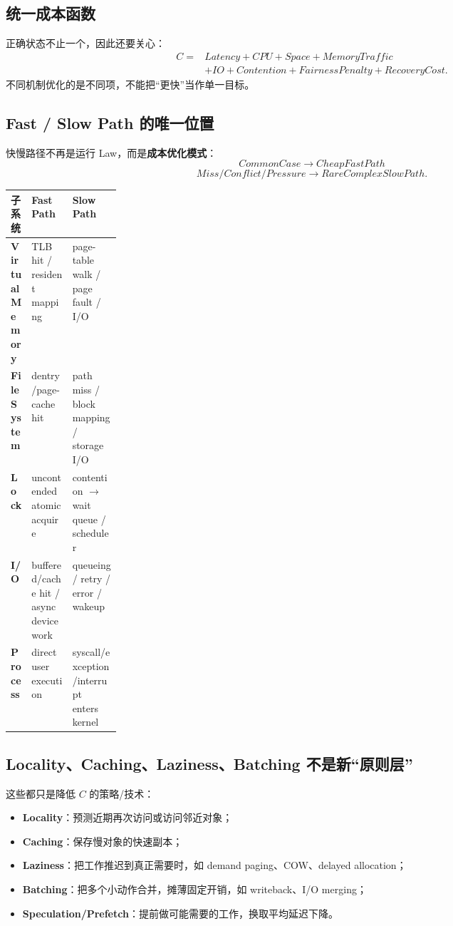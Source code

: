\documentclass[11pt,a4paper]{ctexart}
\newcommand{\kw}[1]{\textbf{#1}}
\begin{document}
\subsection{统一成本函数}
正确状态不止一个，因此还要关心：
\[
\boxed{\begin{aligned}
C={}&Latency+CPU+Space+MemoryTraffic\\
   &+IO+Contention+FairnessPenalty+RecoveryCost.
\end{aligned}}
\]
不同机制优化的是不同项，不能把“更快”当作单一目标。

\subsection{Fast / Slow Path 的唯一位置}
快慢路径不再是运行 Law，而是\kw{成本优化模式}：
\[
\boxed{CommonCase\rightarrow CheapFastPath}
\]
\[
\boxed{Miss/Conflict/Pressure\rightarrow RareComplexSlowPath}.
\]

\begin{center}
\small
\begin{tabularx}{\linewidth}{>{\bfseries}p{0.18\linewidth} X X}
\toprule
子系统 & Fast Path & Slow Path \\
\midrule
Virtual Memory & TLB hit / resident mapping & page-table walk / page fault / I/O \\
File System & dentry/page-cache hit & path miss / block mapping / storage I/O \\
Lock & uncontended atomic acquire & contention $\to$ wait queue / scheduler \\
I/O & buffered/cache hit / async device work & queueing / retry / error / wakeup \\
Process & direct user execution & syscall/exception/interrupt enters kernel \\
\bottomrule
\end{tabularx}
\end{center}

\subsection{Locality、Caching、Laziness、Batching 不是新“原则层”}
这些都只是降低 $C$ 的策略/技术：
\begin{itemize}
  \item \kw{Locality}：预测近期再次访问或访问邻近对象；
  \item \kw{Caching}：保存慢对象的快速副本；
  \item \kw{Laziness}：把工作推迟到真正需要时，如 demand paging、COW、delayed allocation；
  \item \kw{Batching}：把多个小动作合并，摊薄固定开销，如 writeback、I/O merging；
  \item \kw{Speculation/Prefetch}：提前做可能需要的工作，换取平均延迟下降。
\end{itemize}
\end{document}
